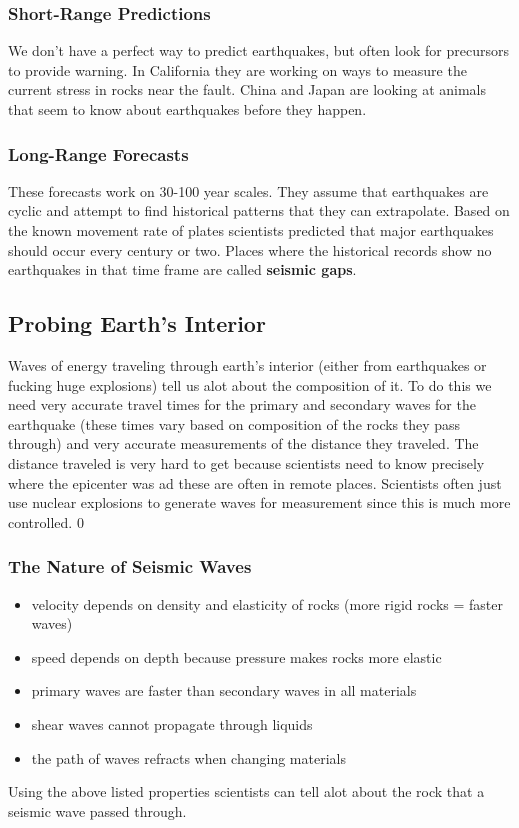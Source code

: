 \documentclass{article}
\begin{document}
\subsubsection{Short-Range Predictions} %
\label{ssub:short_range_predictions}
We don't have a perfect way to predict earthquakes, but often look for precursors to provide warning. In California they are working on ways to measure the current stress in rocks near the fault. China and Japan are looking at animals that seem to know about earthquakes before they happen.
\subsubsection{Long-Range Forecasts} %
\label{ssub:long_range_forecasts}
These forecasts work on 30-100 year scales. They assume that earthquakes are cyclic and attempt to find historical patterns that they can extrapolate. Based on the known movement rate of plates scientists predicted that major earthquakes should occur every century or two. Places where the historical records show no earthquakes in that time frame are called \textbf{seismic gaps}.
\subsection{Probing Earth's Interior} %
\label{sub:probing_earth_s_interior}
Waves of energy traveling through earth's interior (either from earthquakes or fucking huge explosions) tell us alot about the composition of it. To do this we need very accurate travel times for the primary and secondary waves for the earthquake (these times vary based on composition of the rocks they pass through) and very accurate measurements of the distance they traveled. The distance traveled is very hard to get because scientists need to know precisely where the epicenter was ad these are often in remote places. Scientists often just use nuclear explosions to generate waves for measurement since this is much more controlled. 0
\subsubsection{The Nature of Seismic Waves} %
\label{ssub:the_nature_of_seismic_waves}
\begin{itemize}
    \item velocity depends on density and elasticity of rocks (more rigid rocks = faster waves)
    \item speed depends on depth because pressure makes rocks more elastic
    \item primary waves are faster than secondary waves in all materials
    \item shear waves cannot propagate through liquids
    \item the path of waves refracts when changing materials
\end{itemize}
Using the above listed properties scientists can tell alot about the rock that a seismic wave passed through.
\end{document}
